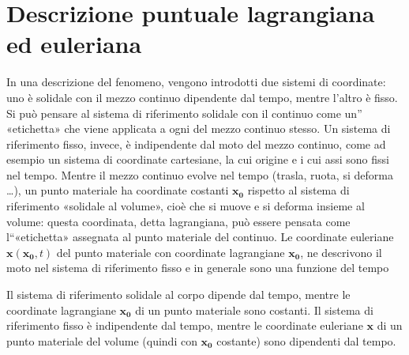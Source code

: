 \documentclass[letterpaper,10pt,italian]{jupyterBook}
\begin{document}
\section{Descrizione puntuale lagrangiana ed euleriana}
\label{\detokenize{polimi/fluidmechanics-ita/template/capitoli/03_cinematica/12teoria:descrizione-puntuale-lagrangiana-ed-euleriana}}\label{\detokenize{polimi/fluidmechanics-ita/template/capitoli/03_cinematica/12teoria:fluid-mechanics-kinematics-differential-lagrange-euler}}
\sphinxAtStartPar
In una descrizione  del fenomeno, vengono introdotti due
sistemi di coordinate: uno è solidale con il mezzo continuo dipendente
dal tempo, mentre l’altro è fisso. Si può pensare al sistema di
riferimento solidale con il continuo come un” «etichetta» che viene
applicata a ogni  del mezzo continuo stesso. Un
sistema di riferimento fisso, invece, è indipendente dal moto del mezzo
continuo, come ad esempio un sistema di coordinate cartesiane, la cui
origine e i cui assi sono fissi nel tempo. Mentre il mezzo continuo
evolve nel tempo (trasla, ruota, si deforma …), un punto materiale ha
coordinate costanti \(\mathbf{x_0}\) rispetto al sistema di riferimento
«solidale al volume», cioè che si muove e si deforma insieme al volume:
questa coordinata, detta lagrangiana, può essere pensata come
l“«etichetta» assegnata al punto materiale del continuo. Le coordinate
euleriane \(\mathbf{x}(\mathbf{x_0},t)\) del punto materiale con coordinate
lagrangiane \(\mathbf{x_0}\), ne descrivono il moto nel sistema di riferimento
fisso e in generale sono una funzione del tempo

\sphinxAtStartPar
Il sistema di riferimento solidale al corpo dipende dal tempo, mentre le
coordinate lagrangiane \(\mathbf{x_0}\) di un punto materiale sono costanti.
Il sistema di riferimento fisso è indipendente dal tempo, mentre le
coordinate euleriane \(\mathbf{x}\) di un punto materiale del volume (quindi
con \(\mathbf{x_0}\) costante) sono dipendenti dal tempo.
\end{document}
